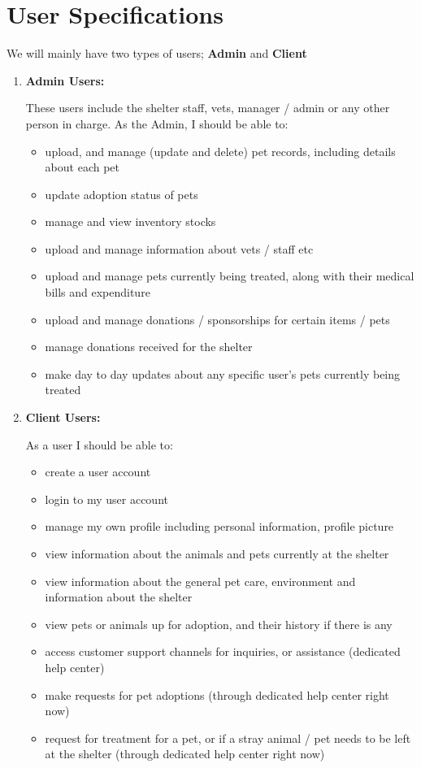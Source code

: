 \section{User Specifications}
We will mainly have two types of users; \textbf{Admin} and \textbf{Client}

\begin{enumerate}
    \item \textbf{Admin Users:} 
    
    These users include the shelter staff, vets, manager / admin or any other person in charge. As the Admin, I should be able to:  \begin{itemize}
        \item upload, and manage (update and delete) pet records, including details about each pet
        \item update adoption status of pets
        \item manage and view inventory stocks
        \item upload and manage information about vets / staff etc
        \item upload and manage pets currently being treated, along with their medical bills and expenditure
        \item upload and manage donations / sponsorships for certain items / pets
        \item manage donations received for the shelter
        \item make day to day updates about any specific user's pets currently being treated        
    \end{itemize}
    \item \textbf{Client Users:} 
    
    As a user I should be able to: \begin{itemize}
        \item create a user account 
        \item login to my user account
        \item manage my own profile including personal information, profile picture
        \item view information about the animals and pets currently at the shelter
        \item view information about the general pet care, environment and information about the shelter
        \item view pets or animals up for adoption, and their history if there is any
        \item access customer support channels for inquiries, or assistance (dedicated help center)
        \item make requests for pet adoptions (through dedicated help center right now)
        \item request for treatment for a pet, or if a stray animal / pet needs to be left at the shelter (through dedicated help center right now)
    \end{itemize}
\end{enumerate}

